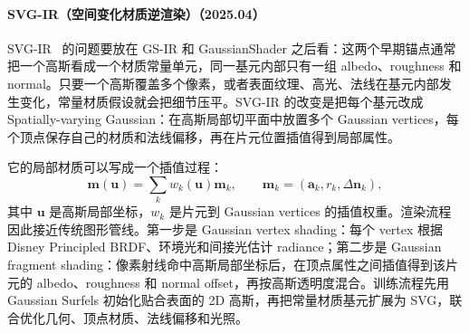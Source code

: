 \paragraph{SVG-IR（空间变化材质逆渲染）（2025.04）}
SVG-IR~\cite{2504_06815} 的问题要放在 GS-IR 和 GaussianShader 之后看：这两个早期锚点通常把一个高斯看成一个材质常量单元，同一基元内部只有一组 albedo、roughness 和 normal。只要一个高斯覆盖多个像素，或者表面纹理、高光、法线在基元内部发生变化，常量材质假设就会把细节压平。SVG-IR 的改变是把每个基元改成 Spatially-varying Gaussian：在高斯局部切平面中放置多个 Gaussian vertices，每个顶点保存自己的材质和法线偏移，再在片元位置插值得到局部属性。

它的局部材质可以写成一个插值过程：
\[
  \mathbf m(\mathbf u)=\sum_k w_k(\mathbf u)\mathbf m_k,\qquad
  \mathbf m_k=(\mathbf a_k,r_k,\Delta\mathbf n_k),
\]
其中 $\mathbf u$ 是高斯局部坐标，$w_k$ 是片元到 Gaussian vertices 的插值权重。渲染流程因此接近传统图形管线。第一步是 Gaussian vertex shading：每个 vertex 根据 Disney Principled BRDF、环境光和间接光估计 radiance；第二步是 Gaussian fragment shading：像素射线命中高斯局部坐标后，在顶点属性之间插值得到该片元的 albedo、roughness 和 normal offset，再按高斯透明度混合。训练流程先用 Gaussian Surfels 初始化贴合表面的 2D 高斯，再把常量材质基元扩展为 SVG，联合优化几何、顶点材质、法线偏移和光照。

